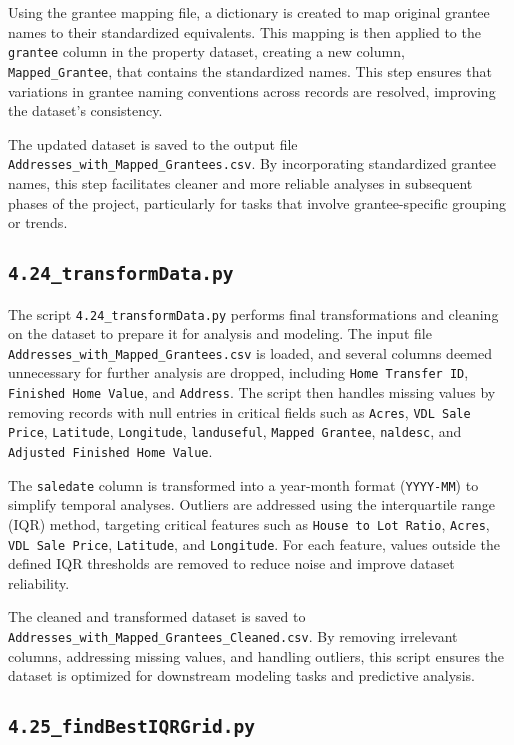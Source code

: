 Using the grantee mapping file, a dictionary is created to map original grantee names to their standardized equivalents. This mapping is then applied to the \texttt{grantee} column in the property dataset, creating a new column, \texttt{Mapped\_Grantee}, that contains the standardized names. This step ensures that variations in grantee naming conventions across records are resolved, improving the dataset's consistency.

The updated dataset is saved to the output file \texttt{Addresses\_with\_Mapped\_Grantees.csv}. By incorporating standardized grantee names, this step facilitates cleaner and more reliable analyses in subsequent phases of the project, particularly for tasks that involve grantee-specific grouping or trends.

\subsection{\texttt{4.24\_transformData.py}}

The script \texttt{4.24\_transformData.py} performs final transformations and cleaning on the dataset to prepare it for analysis and modeling. The input file \texttt{Addresses\_with\_Mapped\_Grantees.csv} is loaded, and several columns deemed unnecessary for further analysis are dropped, including \texttt{Home Transfer ID}, \texttt{Finished Home Value}, and \texttt{Address}. The script then handles missing values by removing records with null entries in critical fields such as \texttt{Acres}, \texttt{VDL Sale Price}, \texttt{Latitude}, \texttt{Longitude}, \texttt{landuseful}, \texttt{Mapped Grantee}, \texttt{naldesc}, and \texttt{Adjusted Finished Home Value}.

The \texttt{saledate} column is transformed into a year-month format (\texttt{YYYY-MM}) to simplify temporal analyses. Outliers are addressed using the interquartile range (IQR) method, targeting critical features such as \texttt{House to Lot Ratio}, \texttt{Acres}, \texttt{VDL Sale Price}, \texttt{Latitude}, and \texttt{Longitude}. For each feature, values outside the defined IQR thresholds are removed to reduce noise and improve dataset reliability. 

The cleaned and transformed dataset is saved to \texttt{Addresses\_with\_Mapped\_Grantees\_Cleaned.csv}. By removing irrelevant columns, addressing missing values, and handling outliers, this script ensures the dataset is optimized for downstream modeling tasks and predictive analysis.

\subsection{\texttt{4.25\_findBestIQRGrid.py}}

